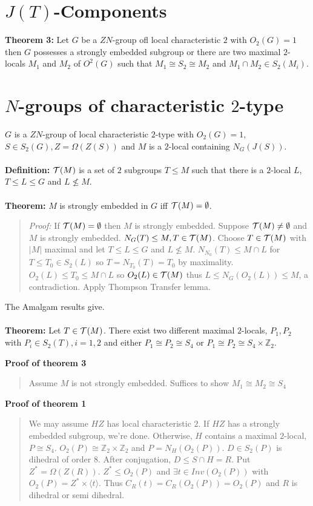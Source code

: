 \section{$J(T)$-Components}
{\bf Theorem 3:}  Let $G$ be a $ZN$-group ofl local characteristic $2$ with $O_2(G)=1$ then
$G$ possesses a strongly embedded subgroup or there are two maximal $2$-locals $M_1$ and $M_2$
of $O^2(G)$ such that $M_1 \cong S_2 \cong M_2$ and $M_1 \cap M_2 \in S_2(M_i)$.
\begin{quote}
\end{quote}

\section{$N$-groups of characteristic $2$-type}
$G$ is a $ZN$-group of local characteristic $2$-type with $O_2(G)=1$, $S \in S_2(G), Z = \Omega(Z(S))$
and $M$ is a $2$-local containing $N_G(J(S))$.
\\
\\
{\bf Definition:}  ${\cal T}(M)$ is a set of $2$ subgroups $T \leq M$ such that
there is a $2$-local $L$, $T \leq L \leq G$ and $L \not\leq M$.
\\
\\
{\bf Theorem:} $M$ is strongly embedded in $G$ iff ${\cal T}(M)= \emptyset$.
\begin{quote}
\emph{Proof:} If ${\cal T}(M)= \emptyset$ then $M$ is strongly embedded.  
Suppose ${\cal T}(M) \neq \emptyset$ and $M$ is strongly embedded.  $N_G(T) \leq M, T \in {\cal T}(M)$.
Choose $T \in {\cal T}(M)$ with $|M|$ maximal and let $T \leq L \leq G$ and $L \not\leq M$.
$N_{N_0}(T) \leq M \cap L$ for $T \leq T_0 \in S_2(L)$ so $T=N_{T_0}(T)=T_0$ by maximality.
$O_2(L) \leq T_0 \leq M \cap L$ so $O_2(L) \in {\cal T}(M)$ thus $L \leq N_G(O_2(L)) \leq M$, a contradiction.
Apply Thompson Transfer lemma.
\end{quote}
The Amalgam results give.\\
\\
{\bf Theorem:} Let $T \in {\cal T}(M)$.  There exist two different maximal $2$-locals, $P_1 , P_2$ with
$P_i \in S_2(T), i = 1, 2$ and either $P_1 \cong P_2 \cong S_4$ or $P_1 \cong P_2 \cong S_4 \times {\mathbb Z}_2$.
\begin{quote}
\end{quote}
{\bf Proof of theorem 3}
\begin{quote}
Assume $M$ is not strongly embedded. Suffices to show $M_1 \cong M_2 \cong S_4$
\end{quote}
{\bf Proof of theorem 1}
\begin{quote}
We may assume $HZ$ has local characteristic $2$.  If $HZ$ has a strongly embedded subgroup, we're done.  Otherwise,
$H$ contains a maximal $2$-local, $P \cong S_4$.  $O_2(P) \cong {\mathbb Z}_2 \times {\mathbb Z}_2$ and $P= N_H(O_2(P))$.
$D \in S_2(P)$ is dihedral of order $8$.  After conjugation, $D \leq S \cap H = R$. Put $Z^*= \Omega(Z(R))$. 
$Z^* \leq O_2(P)$ and $\exists t \in Inv(O_2(P))$ with $O_2(P) = Z^* \times \langle t \rangle$.  Thus
$C_R(t) = C_R(O_2(P)) = O_2(P)$ and $R$ is dihedral or semi dihedral.
\end{quote}

